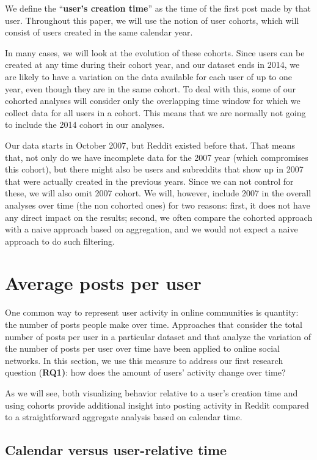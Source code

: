 We define the ``\textbf{user's creation time}'' as the time of the first post made by that user.  Throughout this paper, we will use the notion of user cohorts, which will consist of users created in the same calendar year.

In many cases, we will look at the evolution of these cohorts. Since users can be created at any time during their cohort year, and our dataset ends in 2014, 
we are likely to have a variation on the data available for each user of up to one year, even though they are in the same cohort.  To deal with this, some of our cohorted analyses will consider only the overlapping time window for which we collect data for all users in a cohort.   This means that we are normally not going to include the 2014 cohort in our analyses.

Our data starts in October 2007, but Reddit existed before that. That means that, not only do we have incomplete data for the 2007 year (which compromises this cohort), but there might also be users and subreddits that show up in 2007 that were actually created in the previous years. Since we can not control for these, we will also omit 2007 cohort. We will, however, include 2007 in the overall analyses over time (the non cohorted ones) for two reasons: first, it does not have any direct impact on the results; second, we often compare the cohorted approach with a naive approach based on aggregation, and we would not expect a naive approach to do such filtering. 


\section{Average posts per user}
One common way to represent user activity in online communities is quantity: the number of posts people make over time. Approaches that consider the total number of posts per user in a particular dataset \cite{Gruhl2004} and that analyze the variation of the number of posts per user over time \cite{Guo2009} have been applied to online social networks.  In this section, we use this measure to address our first research question (\textbf{RQ1)}: how does the amount of users' activity change over time?

As we will see, both visualizing behavior relative to a user's creation time and using cohorts provide additional insight into posting activity in Reddit compared to a straightforward aggregate analysis based on calendar time.

\subsection{Calendar versus user-relative time}

